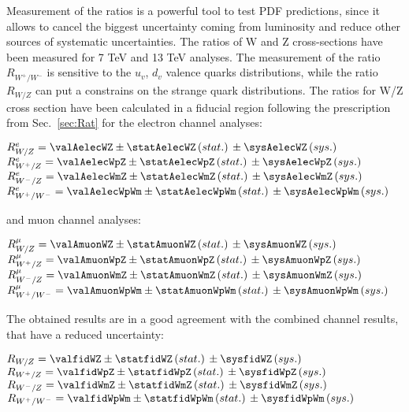 Measurement of the ratios is a powerful tool to test PDF predictions, since it allows to cancel the biggest uncertainty coming from luminosity and reduce other sources of systematic uncertainties. The ratios of W and Z cross-sections have been measured for 7 TeV\cite{a7TeV} and 13 TeV\cite{a13TeV} analyses. The measurement of the ratio $R_{W^{+}/W^{-}}$ is sensitive to the $u_{v}$, $d_{v}$ valence quarks distributions, while the ratio $R_{W/Z}$ can put a constrains on the strange quark distributions. The ratios for W/Z cross section have been calculated in a fiducial region following the prescription from Sec.~\ref{sec:Rat} for the electron channel analyses:
\begin{center}
$R^{e}_{W/Z} = \valAelecWZ \pm \statAelecWZ \, (stat.)\, \pm \sysAelecWZ\, (sys.)\,  $ \\
$R^{e}_{W^{+}/Z} = \valAelecWpZ \pm \statAelecWpZ\, (stat.)\, \pm \sysAelecWpZ \, (sys.)\, $ \\
$R^{e}_{W^{-}/Z} = \valAelecWmZ \pm \statAelecWmZ\, (stat.)\,  \pm \sysAelecWmZ\,  (sys.)\, $ \\
$R^{e}_{W^{+}/W^{-}} = \valAelecWpWm \pm \statAelecWpWm\, (stat.)\, \pm \sysAelecWpWm\,  (sys.)\,  $ \\
\end{center}
and muon channel analyses:
\begin{center}
$R^{\mu}_{W/Z} = \valAmuonWZ \pm \statAmuonWZ \, (stat.)\, \pm \sysAmuonWZ\, (sys.)\,  $ \\
$R^{\mu}_{W^{+}/Z} = \valAmuonWpZ \pm \statAmuonWpZ\, (stat.)\, \pm \sysAmuonWpZ \, (sys.)\, $ \\
$R^{\mu}_{W^{-}/Z} = \valAmuonWmZ \pm \statAmuonWmZ\, (stat.)\,  \pm \sysAmuonWmZ\,  (sys.)\, $ \\
$R^{\mu}_{W^{+}/W^{-}} = \valAmuonWpWm \pm \statAmuonWpWm\, (stat.)\, \pm \sysAmuonWpWm\,  (sys.)\,  $ \\
\end{center}
The obtained results are in a good agreement with the combined channel results, that have a reduced uncertainty:
\begin{center}
$R_{W/Z} = \valfidWZ \pm \statfidWZ \, (stat.)\, \pm \sysfidWZ\, (sys.)\,  $ \\
$R_{W^{+}/Z} = \valfidWpZ \pm \statfidWpZ\, (stat.)\, \pm \sysfidWpZ \, (sys.)\, $ \\
$R_{W^{-}/Z} = \valfidWmZ \pm \statfidWmZ\, (stat.)\,  \pm \sysfidWmZ\,  (sys.)\, $ \\
$R_{W^{+}/W^{-}} = \valfidWpWm \pm \statfidWpWm\, (stat.)\, \pm \sysfidWpWm\,  (sys.)\,  $ \\
\end{center}
